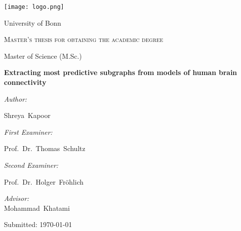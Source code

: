 \begin{titlepage}
	\centering
     
    \texttt{[image: logo.png]}\par
    \vspace{0.7cm}
	{\textsc\LARGE University of Bonn}\par
	\vspace{1.2cm}
	{\scshape Master's thesis for obtaining the academic degree \par\glqq Master of Science (M.Sc.)\grqq  \par}
	\vspace{2cm}
	
	{\Large\bfseries Extracting most predictive subgraphs from models of human brain connectivity }\par
	\vspace{1.4cm}
	
	\noindent
    \begin{minipage}[t]{0.4\textwidth}
        \begin{flushleft} \large
            \emph{Author:}\par
            Shreya~Kapoor
        \end{flushleft}        
    \end{minipage}    
    \begin{minipage}[t]{0.5\textwidth}
        \begin{flushright} \large
            \emph{First Examiner:}\par
            Prof.~Dr.~Thomas~Schultz\par\vspace{0.5cm}
            
            \emph{Second Examiner:}\par
            Prof.~Dr.~Holger~Fröhlich\par\vspace{0.5cm}

            \emph{Advisor:} \\
            Mohammad~Khatami\par\vspace{0.5cm}
        \end{flushright}
    \end{minipage}

    \vfill
	
    {\large Submitted:\hspace{1cm} \today}
\end{titlepage}
